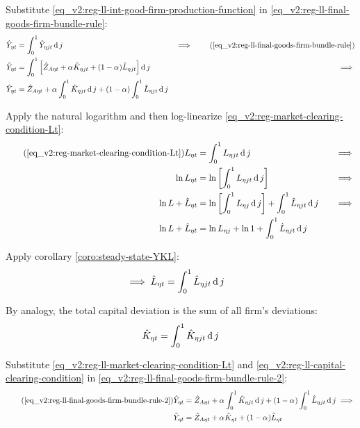 \documentclass[../thesis.tex]{subfiles}
\begin{document}
Substitute \ref{eq_v2:reg-ll-int-good-firm-production-function} in \ref{eq_v2:reg-ll-final-goods-firm-bundle-rule}:
\begin{alignat}{2}
	\hat{Y}_{\eta t} &= \int_{0}^{1} \hat{Y}_{\eta jt} \dif j &\implies \tag{\ref{eq_v2:reg-ll-final-goods-firm-bundle-rule}} \\
	\hat{Y}_{\eta t} &= \int_{0}^{1} \left[ \hat{Z}_{A\eta t} + {\alpha_{}} \hat{K}_{\eta jt} + (1-{\alpha_{}}) \hat{L}_{\eta jt} \right] \dif j &\implies \nonumber \\
	\hat{Y}_{\eta t} &= \hat{Z}_{A\eta t} + {\alpha_{}} \int_{0}^{1} \hat{K}_{\eta jt} \dif j + (1-{\alpha_{}}) \int_{0}^{1} \hat{L}_{\eta jt} \dif j \label{eq_v2:reg-ll-final-goods-firm-bundle-rule-2}
\end{alignat}

Apply the natural logarithm and then log-linearize \ref{eq_v2:reg-market-clearing-condition-Lt}:
\begin{alignat}{2}
	\tag{\ref{eq_v2:reg-market-clearing-condition-Lt}}
	L_{\eta t} &= \int_{0}^{1} L_{\eta jt} \dif j &\implies \\
	\ln L_{\eta t} &= \ln \left[ \int_{0}^{1} L_{\eta jt} \dif j \right] &\implies \nonumber \\
	\ln L + \hat{L}_{\eta t} &= \ln \left[ \int_{0}^{1} L_{\eta j} \dif j \right] + \int_{0}^{1} \hat{L}_{\eta jt} \dif j \quad &\implies \nonumber \\
	\ln L + \hat{L}_{\eta t} &= \ln L_{\eta j} + \ln 1 + \int_{0}^{1} \hat{L}_{\eta jt} \dif j \nonumber
\end{alignat}

Apply corollary \ref{coro:steady-state-YKL}:
\begin{align}
	\implies \hat{L}_{\eta t} &= \int_{0}^{1} \hat{L}_{\eta jt} \operatorname{d} j \label{eq_v2:reg-ll-market-clearing-condition-Lt}
\end{align}

By analogy, the total capital deviation is the sum of all firm's deviations:
\begin{align}
	\hat{K}_{\eta t} = \int_{0}^{1} \hat{K}_{\eta jt} \operatorname{d} j \label{eq_v2:reg-ll-capital-clearing-condition}
\end{align}

Substitute \ref{eq_v2:reg-ll-market-clearing-condition-Lt} and \ref{eq_v2:reg-ll-capital-clearing-condition} in \ref{eq_v2:reg-ll-final-goods-firm-bundle-rule-2}:
\begin{align}
	\tag{\ref{eq_v2:reg-ll-final-goods-firm-bundle-rule-2}}
	\hat{Y}_{\eta t} &= \hat{Z}_{A\eta t} + {\alpha_{}} \int_{0}^{1} \hat{K}_{\eta jt} \dif j + (1-{\alpha_{}}) \int_{0}^{1} \hat{L}_{\eta jt} \dif j \implies \\
	\hat{Y}_{\eta t} &= \hat{Z}_{A\eta t} + {\alpha_{}} \hat{K}_{\eta t} + (1-{\alpha_{}}) \hat{L}_{\eta t} \label{eq_v2:reg-ll-final-goods-firm-bundle-rule-3}
\end{align}
\end{document}
